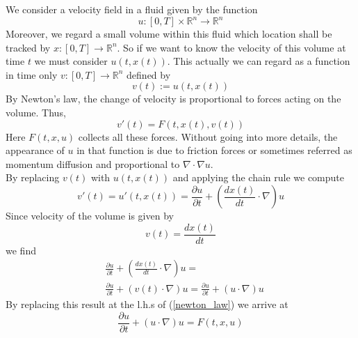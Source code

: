 \documentclass[17pt]{extarticle}
\begin{document}
	We consider a velocity field in a fluid given by the function 
	$$
	u:[0,T]\times\mathbb{R}^n\rightarrow\mathbb{R}^n
	$$
	Moreover, we regard a small volume within this fluid which location shall be tracked by $x:[0,T]\rightarrow\mathbb{R}^n$.
	So if we want to know the velocity of this volume at time $t$ we must consider $u(t, x(t))$. This actually we can regard as a function in time only $v:[0,T]\rightarrow\mathbb{R}^n$ defined by 
	$$
	v(t):=u(t, x(t))
	$$
	By Newton's law, the change of velocity is proportional to forces acting on the volume. Thus,
	\begin{equation} \label{newton_law}
	v'(t)=F(t,x(t), v(t))
	\end{equation}
	Here $F(t, x, u)$ collects all these forces. Without going into more details, the appearance of $u$ in that function is due to friction forces or sometimes referred as momentum diffusion and proportional to $\nabla\cdot\nabla u$.\\
	By replacing $v(t)$ with $u(t, x(t))$ and applying the chain rule we compute
	\begin{equation*}
	v'(t)=u'(t, x(t))=\frac{\partial u}{\partial t}+
	\left(\frac{d x(t)}{dt}\cdot \nabla \right)u
	\end{equation*}
	Since velocity of the volume is given by
	$$
	v(t)=\frac{d x(t)}{dt}
	$$
	we find
	\begin{align*}
	&	\frac{\partial u}{\partial t}+
		\left(\frac{d x(t)}{dt}\cdot \nabla \right)u=\\
	&\frac{\partial u}{\partial t}+
	\left(v(t)\cdot \nabla \right)u=\frac{\partial u}{\partial t}+
	\left(u\cdot \nabla \right)u
	\end{align*}
	By replacing this result at the l.h.s of (\ref{newton_law}) we arrive at
	$$
	\frac{\partial u}{\partial t}+
	\left(u\cdot \nabla \right)u=F(t,x, u)
	$$	
\end{document}
